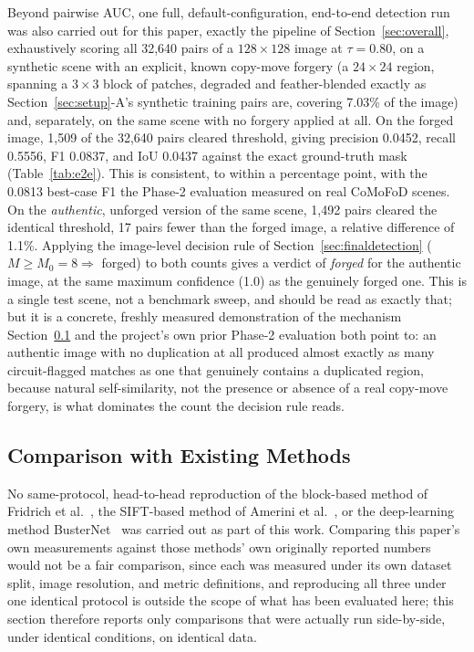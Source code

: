 \documentclass[conference]{IEEEtran}
\begin{document}
Beyond pairwise AUC, one full, default-configuration, end-to-end detection run was also carried out for this paper, exactly the pipeline of Section~\ref{sec:overall}, exhaustively scoring all 32,640 pairs of a $128\times128$ image at $\tau = 0.80$, on a synthetic scene with an explicit, known copy-move forgery (a $24\times24$ region, spanning a $3\times3$ block of patches, degraded and feather-blended exactly as Section~\ref{sec:setup}-A's synthetic training pairs are, covering 7.03\% of the image) and, separately, on the same scene with no forgery applied at all. On the forged image, 1,509 of the 32,640 pairs cleared threshold, giving precision 0.0452, recall 0.5556, F1 0.0837, and IoU 0.0437 against the exact ground-truth mask (Table~\ref{tab:e2e}). This is consistent, to within a percentage point, with the 0.0813 best-case F1 the Phase-2 evaluation measured on real CoMoFoD scenes. On the \emph{authentic}, unforged version of the same scene, 1,492 pairs cleared the identical threshold, 17 pairs fewer than the forged image, a relative difference of 1.1\%. Applying the image-level decision rule of Section~\ref{sec:finaldetection} ($M \ge M_0 = 8 \Rightarrow$ forged) to both counts gives a verdict of \emph{forged} for the authentic image, at the same maximum confidence (1.0) as the genuinely forged one. This is a single test scene, not a benchmark sweep, and should be read as exactly that; but it is a concrete, freshly measured demonstration of the mechanism Section~\ref{sec:compare} and the project's own prior Phase-2 evaluation both point to: an authentic image with no duplication at all produced almost exactly as many circuit-flagged matches as one that genuinely contains a duplicated region, because natural self-similarity, not the presence or absence of a real copy-move forgery, is what dominates the count the decision rule reads.

\subsection{Comparison with Existing Methods}\label{sec:compare}
No same-protocol, head-to-head reproduction of the block-based method of Fridrich et al.~\cite{fridrich2003}, the SIFT-based method of Amerini et al.~\cite{amerini2011}, or the deep-learning method BusterNet~\cite{busternet2018} was carried out as part of this work. Comparing this paper's own measurements against those methods' own originally reported numbers would not be a fair comparison, since each was measured under its own dataset split, image resolution, and metric definitions, and reproducing all three under one identical protocol is outside the scope of what has been evaluated here; this section therefore reports only comparisons that were actually run side-by-side, under identical conditions, on identical data.
\end{document}
